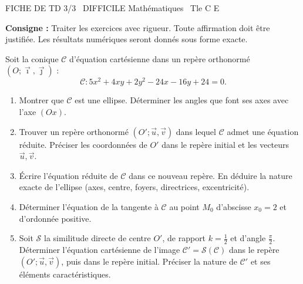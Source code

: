 \documentclass[11pt]{article}
\begin{document}
\begin{tcolorbox}[enhanced,colback=popink,colframe=popink,arc=10pt,boxrule=0pt,left=12pt,right=12pt,top=9pt,bottom=9pt]
{\color{white}\popxbold\small FICHE DE TD 3/3 \textbullet\ DIFFICILE \hfill Mathématiques \textbullet\ Tle C E\par}
\end{tcolorbox}
\vspace{4pt}
\noindent \textbf{Consigne :} Traiter les exercices avec rigueur. Toute affirmation doit être justifiée. Les résultats numériques seront donnés sous forme exacte.

\begin{exercice}
Soit la conique $\mathcal{C}$ d'équation cartésienne dans un repère orthonormé $(O;\vec{\imath},\vec{\jmath})$ :
\[
\mathcal{C} : 5x^2 + 4xy + 2y^2 - 24x - 16y + 24 = 0.
\]
\begin{enumerate}
    \item Montrer que $\mathcal{C}$ est une ellipse. Déterminer les angles que font ses axes avec l'axe $(Ox)$.
    \item Trouver un repère orthonormé $(O';\vec{u},\vec{v})$ dans lequel $\mathcal{C}$ admet une équation réduite. Préciser les coordonnées de $O'$ dans le repère initial et les vecteurs $\vec{u},\vec{v}$.
    \item Écrire l'équation réduite de $\mathcal{C}$ dans ce nouveau repère. En déduire la nature exacte de l'ellipse (axes, centre, foyers, directrices, excentricité).
    \item Déterminer l'équation de la tangente à $\mathcal{C}$ au point $M_0$ d'abscisse $x_0 = 2$ et d'ordonnée positive.
    \item Soit $\mathcal{S}$ la similitude directe de centre $O'$, de rapport $k = \frac{1}{2}$ et d'angle $\frac{\pi}{2}$. Déterminer l'équation cartésienne de l'image $\mathcal{C}' = \mathcal{S}(\mathcal{C})$ dans le repère $(O';\vec{u},\vec{v})$, puis dans le repère initial. Préciser la nature de $\mathcal{C}'$ et ses éléments caractéristiques.
\end{enumerate}
\end{exercice}
\end{document}
